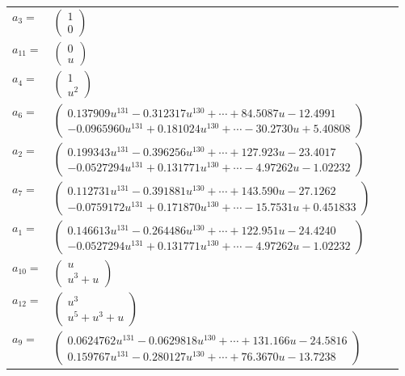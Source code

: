 \documentclass[1p]{elsarticle_modified}
\theoremstyle{definition}
\begin{document}
\begin{tabular}{m{7pt} m{180pt} m{7pt} m{180pt} }
\flushright $a_{3}=$&$\begin{pmatrix}1\\0\end{pmatrix}$ \\
\flushright $a_{11}=$&$\begin{pmatrix}0\\u\end{pmatrix}$ \\
\flushright $a_{4}=$&$\begin{pmatrix}1\\u^2\end{pmatrix}$ \\
\flushright $a_{6}=$&$\begin{pmatrix}0.137909 u^{131}-0.312317 u^{130}+\cdots+84.5087 u-12.4991\\-0.0965960 u^{131}+0.181024 u^{130}+\cdots-30.2730 u+5.40808\end{pmatrix}$ \\
\flushright $a_{2}=$&$\begin{pmatrix}0.199343 u^{131}-0.396256 u^{130}+\cdots+127.923 u-23.4017\\-0.0527294 u^{131}+0.131771 u^{130}+\cdots-4.97262 u-1.02232\end{pmatrix}$ \\
\flushright $a_{7}=$&$\begin{pmatrix}0.112731 u^{131}-0.391881 u^{130}+\cdots+143.590 u-27.1262\\-0.0759172 u^{131}+0.171870 u^{130}+\cdots-15.7531 u+0.451833\end{pmatrix}$ \\
\flushright $a_{1}=$&$\begin{pmatrix}0.146613 u^{131}-0.264486 u^{130}+\cdots+122.951 u-24.4240\\-0.0527294 u^{131}+0.131771 u^{130}+\cdots-4.97262 u-1.02232\end{pmatrix}$ \\
\flushright $a_{10}=$&$\begin{pmatrix}u\\u^3+u\end{pmatrix}$ \\
\flushright $a_{12}=$&$\begin{pmatrix}u^3\\u^5+u^3+u\end{pmatrix}$ \\
\flushright $a_{9}=$&$\begin{pmatrix}0.0624762 u^{131}-0.0629818 u^{130}+\cdots+131.166 u-24.5816\\0.159767 u^{131}-0.280127 u^{130}+\cdots+76.3670 u-13.7238\end{pmatrix}$ \\

\end{tabular}
\end{document}
